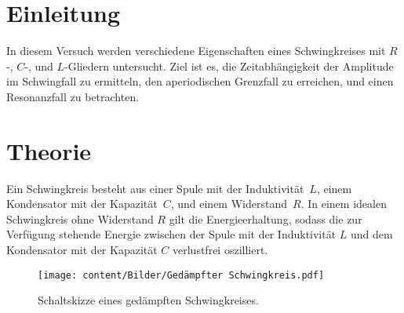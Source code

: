 \section{Einleitung}
\label{sec:Einleitung}
In diesem Versuch werden verschiedene Eigenschaften eines Schwingkreises mit $R$-, $C$-, und $L$-Gliedern untersucht. Ziel 
ist es, die Zeitabhängigkeit der Amplitude im Schwingfall zu ermitteln, den aperiodischen Grenzfall zu erreichen, und einen
Resonanzfall zu betrachten.

\section{Theorie}
\label{sec:Theorie}
Ein Schwingkreis besteht aus einer Spule mit der Induktivität~$L$, einem Kondensator mit der Kapazität~$C$, und einem 
Widerstand~$R$. In einem idealen Schwingkreis ohne Widerstand $R$ gilt die Energieerhaltung, sodass die zur Verfügung stehende 
Energie zwischen der Spule mit der Induktivität $L$ und dem Kondensator mit der Kapazität $C$ verlustfrei oszilliert.
\begin{figure} [H]
    \centering
    \texttt{[image: content/Bilder/Gedämpfter Schwingkreis.pdf]}
    \caption{Schaltskizze eines gedämpften Schwingkreises. \cite{v354}}
    \label{fig:Schaltskizze Schwingkreis}
  \end{figure}

